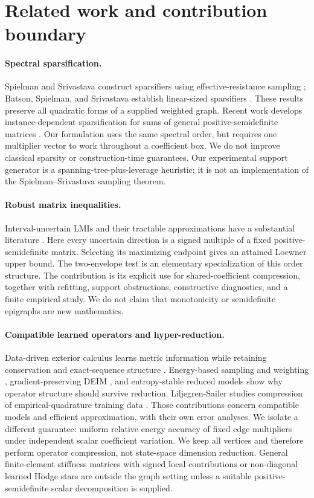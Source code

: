 \documentclass[11pt]{article}
\begin{document}
\section{Related work and contribution boundary}
\paragraph{Spectral sparsification.}
Spielman and Srivastava construct sparsifiers using effective-resistance sampling \cite{ss}; Batson, Spielman, and Srivastava establish linear-sized sparsifiers \cite{bss}. These results preserve all quadratic forms of a supplied weighted graph. Recent work develops instance-dependent sparsification for sums of general positive-semidefinite matrices \cite{basu}. Our formulation uses the same spectral order, but requires one multiplier vector to work throughout a coefficient box. We do not improve classical sparsity or construction-time guarantees. Our experimental support generator is a spanning-tree-plus-leverage heuristic; it is not an implementation of the Spielman--Srivastava sampling theorem.

\paragraph{Robust matrix inequalities.}
Interval-uncertain LMIs and their tractable approximations have a substantial literature \cite{bental}. Here every uncertain direction is a signed multiple of a fixed positive-semidefinite matrix. Selecting its maximizing endpoint gives an attained Loewner upper bound. The two-envelope test is an elementary specialization of this order structure. The contribution is its explicit use for shared-coefficient compression, together with refitting, support obstructions, constructive diagnostics, and a finite empirical study. We do not claim that monotonicity or semidefinite epigraphs are new mathematics.

\paragraph{Compatible learned operators and hyper-reduction.}
Data-driven exterior calculus learns metric information while retaining conservation and exact-sequence structure \cite{trask}. Energy-based sampling and weighting \cite{farhat}, gradient-preserving DEIM \cite{pagliantini}, and entropy-stable reduced models \cite{chan} show why operator structure should survive reduction. Liljegren-Sailer studies compression of empirical-quadrature training data \cite{liljegren}. Those contributions concern compatible models and efficient approximation, with their own error analyses. We isolate a different guarantee: uniform relative energy accuracy of fixed edge multipliers under independent scalar coefficient variation. We keep all vertices and therefore perform operator compression, not state-space dimension reduction. General finite-element stiffness matrices with signed local contributions or non-diagonal learned Hodge stars are outside the graph setting unless a suitable positive-semidefinite scalar decomposition is supplied.
\end{document}
